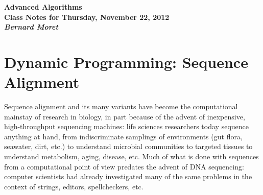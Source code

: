 \documentclass[11pt]{article}
\begin{document}
\begin{center}
  \LARGE\bf Advanced Algorithms\\

  \Large\sf
  Class Notes for Thursday, November 22, 2012\\

  \it
  Bernard Moret
\end{center}

\bigskip

\section{Dynamic Programming: Sequence Alignment}
Sequence alignment and its many variants have become the computational
mainstay of research in biology, in part because of the advent of inexpensive,
high-throughput sequencing machines: life sciences researchers today sequence
anything at hand, from indiscriminate samplings of environments (gut flora,
seawater, dirt, etc.) to understand microbial communities to targeted tissues
to understand metabolism, aging, disease, etc.  Much of what is done with
sequences from a computational point of view predates the advent of DNA
sequencing: computer scientists had already investigated many of the same
problems in the context of strings, editors, spellcheckers, etc.
\end{document}
